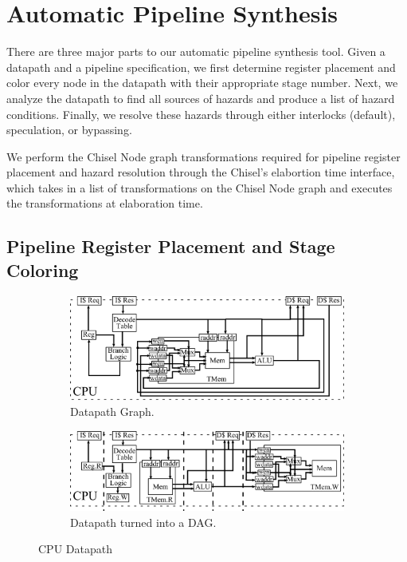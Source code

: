 \section{Automatic Pipeline Synthesis}
There are three major parts to our automatic pipeline synthesis
tool. Given a datapath and a pipeline specification, we first
determine register placement and color every node in the datapath with
their appropriate stage number. Next, we analyze the datapath to find
all sources of hazards and produce a list of hazard
conditions. Finally, we resolve these hazards through either
interlocks (default), speculation, or bypassing.

We perform the Chisel Node graph transformations required for pipeline register placement and hazard resolution through the Chisel's elabortion time interface, which takes in a list of transformations on the Chisel Node graph and executes the transformations at elaboration time.
\subsection{Pipeline Register Placement and Stage Coloring}
\begin{figure}[htb]
\centering
  \begin{subfigure}[t]{0.8\textwidth}
  \centering
  \includegraphics[width=\textwidth]{figures/pipeline.pdf}
  \caption{Datapath Graph.}
  \label{fig:datapathgrah}
  \end{subfigure}
  \begin{subfigure}[t]{0.8\textwidth}
  \vspace{20pt}
  \centering
  \includegraphics[width=\textwidth]{figures/pipelinedag.pdf}
  \caption{Datapath turned into a DAG.}
  \label{fig:datapathdag}
  \end{subfigure}
\caption{CPU Datapath}
\label{fig:datapath}
\end{figure}

